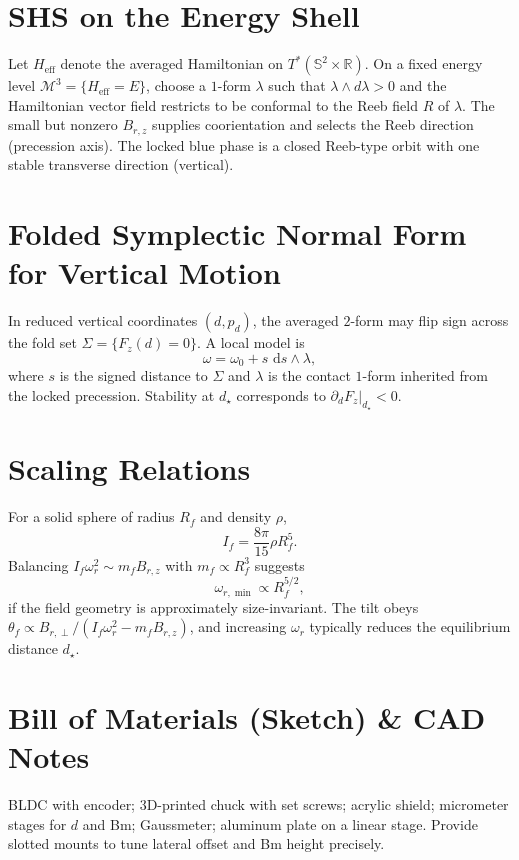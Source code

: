 \documentclass[11pt]{article}
\newcommand{\RR}{\mathbb{R}}
\newcommand{\SSS}{\mathbb{S}}
\renewcommand{\dd}{\,\mathrm{d}}
\newcommand{\calM}{\mathcal{M}}
\theoremstyle{definition}
\theoremstyle{plain}
\begin{document}
\section{SHS on the Energy Shell}
Let \(H_{\mathrm{eff}}\) denote the averaged Hamiltonian on \(T^*(\SSS^2\times\RR)\).
On a fixed energy level \(\calM^3=\{H_{\mathrm{eff}}=E\}\), choose a \(1\)-form \(\lambda\) such that \(\lambda\wedge d\lambda>0\) and the Hamiltonian vector field restricts to be conformal to the Reeb field \(R\) of \(\lambda\).
The small but nonzero \(B_{r,z}\) supplies coorientation and selects the Reeb direction (precession axis).
The locked blue phase is a closed Reeb-type orbit with one stable transverse direction (vertical).

\section{Folded Symplectic Normal Form for Vertical Motion}
In reduced vertical coordinates \((d,p_d)\), the averaged \(2\)-form may flip sign across the fold set \(\Sigma=\{F_z(d)=0\}\).
A local model is
\begin{equation}
  \omega = \omega_0 + s\,\dd s\wedge \lambda,
\end{equation}
where \(s\) is the signed distance to \(\Sigma\) and \(\lambda\) is the contact \(1\)-form inherited from the locked precession.
Stability at \(d_\star\) corresponds to \(\partial_d F_z|_{d_\star}<0\).

\section{Scaling Relations}
\label{sec:scaling}
For a solid sphere of radius \(R_f\) and density \(\rho\),
\begin{equation}
  I_f = \frac{8\pi}{15}\rho R_f^5.
\end{equation}
Balancing \(I_f\omega_r^2 \sim m_f B_{r,z}\) with \(m_f\propto R_f^3\) suggests
\begin{equation}
  \omega_{r,\min} \propto R_f^{5/2},
\end{equation}
if the field geometry is approximately size-invariant. The tilt obeys
\(
\theta_f \propto B_{r,\perp}/(I_f\omega_r^2 - m_f B_{r,z})
\),
and increasing \(\omega_r\) typically reduces the equilibrium distance \(d_\star\).

\section{Bill of Materials (Sketch) \& CAD Notes}
BLDC with encoder; 3D-printed chuck with set screws; acrylic shield; micrometer stages for \(d\) and Bm; Gaussmeter; aluminum plate on a linear stage. Provide slotted mounts to tune lateral offset and Bm height precisely.
\end{document}
